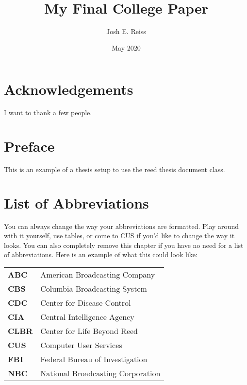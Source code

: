 \documentclass[12pt,twoside]{reedthesis}
\title{My Final College Paper}
\author{Josh E. Reiss}
\date{May 2020}
\begin{document}
  \maketitle
  \frontmatter %
  \pagestyle{empty} %

    \chapter*{Acknowledgements}
	I want to thank a few people.

    \chapter*{Preface}
	This is an example of a thesis setup to use the reed thesis document class.
	
	

    \chapter*{List of Abbreviations}
		You can always change the way your abbreviations are formatted. Play around with it yourself, use tables, or come to CUS if you'd like to change the way it looks. You can also completely remove this chapter if you have no need for a list of abbreviations. Here is an example of what this could look like:

	\begin{table}[h]
	\centering %
	\begin{tabular}{ll}
		\textbf{ABC}  	&  American Broadcasting Company \\
		\textbf{CBS}  	&  Columbia Broadcasting System\\
		\textbf{CDC}  	&  Center for Disease Control \\
		\textbf{CIA}  	&  Central Intelligence Agency\\
		\textbf{CLBR} 	&  Center for Life Beyond Reed\\
		\textbf{CUS}  	&  Computer User Services\\
		\textbf{FBI}  	&  Federal Bureau of Investigation\\
		\textbf{NBC}  	&  National Broadcasting Corporation\\
	\end{tabular}
	\end{table}
	
\end{document}
